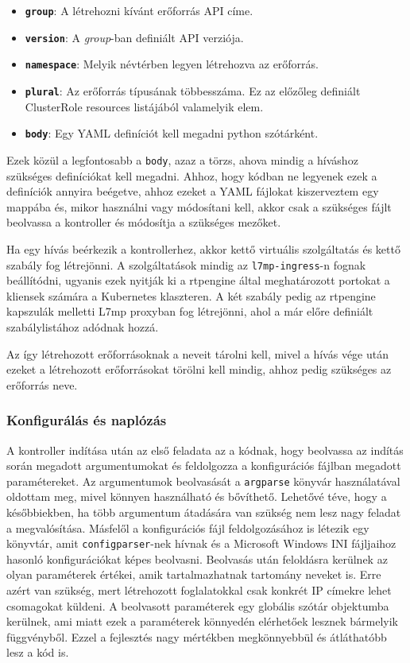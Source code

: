 \begin{itemize}
	\item \textbf{\texttt{group}}: A létrehozni kívánt erőforrás API címe.  
	\item \textbf{\texttt{version}}: A \textit{group}-ban definiált API verziója. 
	\item \textbf{\texttt{namespace}}: Melyik névtérben legyen létrehozva az erőforrás.
	\item \textbf{\texttt{plural}}: Az erőforrás típusának többesszáma. Ez az előzőleg 
	definiált ClusterRole resources listájából valamelyik elem. 
	\item \textbf{\texttt{body}}: Egy YAML definíciót kell megadni python szótárként. 
\end{itemize}

Ezek közül a legfontosabb a \texttt{body}, azaz a törzs, ahova mindig a híváshoz 
szükséges definíciókat kell megadni. Ahhoz, hogy kódban ne legyenek ezek a definíciók 
annyira beégetve, ahhoz ezeket a YAML fájlokat kiszerveztem egy mappába és, mikor 
használni vagy módosítani kell, akkor csak a szükséges fájlt beolvassa a kontroller és 
módosítja a szükséges mezőket.

Ha egy hívás beérkezik a kontrollerhez, akkor kettő virtuális szolgáltatás és kettő
szabály fog létrejönni. A szolgáltatások mindig az \texttt{l7mp-ingress}-n fognak 
beállítódni, ugyanis ezek nyitják ki a rtpengine által meghatározott portokat a kliensek 
számára a Kubernetes klaszteren. A két szabály pedig az rtpengine kapszulák melletti L7mp 
proxyban fog létrejönni, ahol a már előre definiált szabálylistához adódnak hozzá. 

Az így létrehozott erőforrásoknak a neveit tárolni kell, mivel a hívás vége után ezeket
a létrehozott erőforrásokat törölni kell mindig, ahhoz pedig szükséges az erőforrás 
neve. 

\subsubsection{Konfigurálás és naplózás}

A kontroller indítása után az első feladata az a kódnak, hogy beolvassa az indítás
során megadott argumentumokat és feldolgozza a konfigurációs fájlban megadott 
paramétereket. Az argumentumok beolvasását a \texttt{argparse} \cite{argparse} könyvár 
használatával oldottam meg, mivel könnyen használható és bővíthető. Lehetővé téve, hogy a
későbbiekben, ha több argumentum átadására van szükség nem lesz nagy feladat a 
megvalósítása. Másfelől a konfigurációs fájl feldolgozásához is létezik egy könyvtár, 
amit \texttt{configparser}-nek \cite{configparser} hívnak és a Microsoft Windows INI 
fájljaihoz hasonló konfigurációkat képes beolvasni. Beolvasás után feloldásra kerülnek az 
olyan paraméterek értékei, amik tartalmazhatnak tartomány neveket is. Erre azért van 
szükség, mert létrehozott foglalatokkal csak konkrét IP címekre lehet csomagokat küldeni. 
A beolvasott paraméterek egy globális szótár objektumba kerülnek, ami miatt ezek a 
paraméterek könnyedén elérhetőek lesznek bármelyik függvényből. Ezzel a fejlesztés nagy 
mértékben megkönnyebbül és átláthatóbb lesz a kód is.

